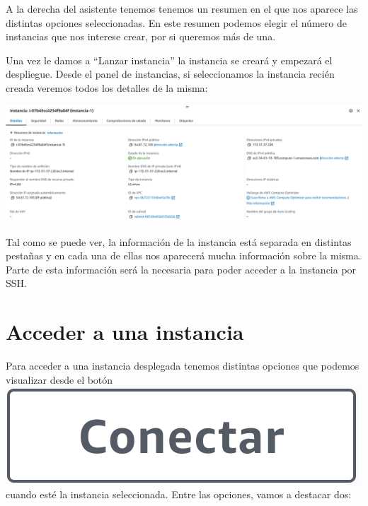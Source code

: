 A la derecha del asistente tenemos tenemos un resumen en el que nos aparece las distintas opciones seleccionadas. En este resumen podemos elegir el número de instancias que nos interese crear, por si queremos más de una.

Una vez le damos a “Lanzar instancia” la instancia se creará y empezará el despliegue. Desde el panel de instancias, si seleccionamos la instancia recién creada veremos todos los detalles de la misma:

\begin{center}
	\includegraphics[frame,width=0.9\linewidth]{img/aws/ec2_instance_info.png}
\end{center}

Tal como se puede ver, la información de la instancia está separada en distintas pestañas y en cada una de ellas nos aparecerá mucha información sobre la misma. Parte de esta información será la necesaria para poder acceder a la instancia por SSH.


\section{Acceder a una instancia}

Para acceder a una instancia desplegada tenemos distintas opciones que podemos visualizar desde el botón \includegraphics[height=0.8\baselineskip]{img/aws/ec2_instance_connect.png} cuando esté la instancia seleccionada. Entre las opciones, vamos a destacar dos:

